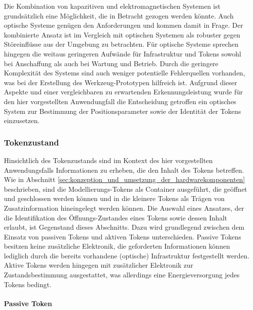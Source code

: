 Die Kombination von kapazitiven und elektromagnetischen Systemen ist grundsätzlich eine Möglichkeit, die in Betracht gezogen werden könnte. Auch optische Systeme genügen den Anforderungen und kommen damit in Frage. Der kombinierte Ansatz ist im Vergleich mit optischen Systemen als robuster gegen Störeinflüsse aus der Umgebung zu betrachten. Für optische Systeme sprechen hingegen die weitaus geringeren Aufwände für Infrastruktur und Tokens sowohl bei Anschaffung als auch bei Wartung und Betrieb. Durch die geringere Komplexität des Systems sind auch weniger potentielle Fehlerquellen vorhanden, was bei der Erstellung des Werkzeug-Prototypen hilfreich ist. Aufgrund dieser Aspekte und einer vergleichbaren zu erwartenden Erkennungsleistung wurde für den hier vorgestellten Anwendungfall die Entscheidung getroffen ein optisches System zur Bestimmung der Positionsparameter sowie der Identität der Tokens einzusetzen.



\subsubsection{Tokenzustand} %
\label{ssub:tokenzustand}

Hinsichtlich des Tokenzustands sind im Kontext des hier vorgestellten Anwendungsfalls Informationen zu erheben, die den Inhalt des Tokens betreffen. Wie in Abschnitt \ref{sec:konzeption_und_umsetzung_der_hardwarekomponenten} beschrieben, sind die Modellierungs-Tokens als Container ausgeführt, die geöffnet und geschlossen werden können und in die kleinere Tokens als Trägen von Zusatzinformation hineingelegt werden können. Die Auswahl eines Ansatzes, der die Identifikation des Öffnungs-Zustandes eines Tokens sowie dessen Inhalt erlaubt, ist Gegenstand dieses Abschnitts. Dazu wird grundlegend zwischen dem Einsatz von passiven Tokens und aktiven Tokens unterschieden. Passive Tokens besitzen keine zusätzliche Elektronik, die geforderten Informationen können lediglich durch die bereits vorhandene (optische) Infrastruktur festgestellt werden. Aktive Tokens werden hingegen mit zusätzlicher Elektronik zur Zustandsbestimmung ausgestattet, was allerdings eine Energieversorgung jedes Tokens bedingt.

\paragraph{Passive Token} %
\label{par:passive_token}
 
